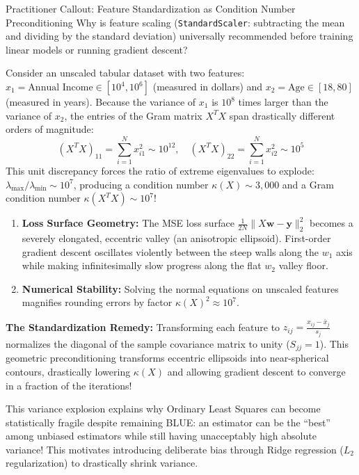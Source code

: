 \begin{intuitionbox}{Practitioner Callout: Feature Standardization as Condition Number Preconditioning}
Why is feature scaling (\texttt{StandardScaler}: subtracting the mean and dividing by the standard deviation) universally recommended before training linear models or running gradient descent?

Consider an unscaled tabular dataset with two features: $x_1 = \text{Annual Income} \in [10^4, 10^6]$ (measured in dollars) and $x_2 = \text{Age} \in [18, 80]$ (measured in years).
Because the variance of $x_1$ is $10^8$ times larger than the variance of $x_2$, the entries of the Gram matrix $X^T X$ span drastically different orders of magnitude:
\begin{equation*}
(X^T X)_{11} = \sum_{i=1}^N x_{i1}^2 \sim 10^{12}, \quad (X^T X)_{22} = \sum_{i=1}^N x_{i2}^2 \sim 10^5
\end{equation*}
This unit discrepancy forces the ratio of extreme eigenvalues to explode: $\lambda_{\max} / \lambda_{\min} \sim 10^7$, producing a condition number $\kappa(X) \sim 3{,}000$ and a Gram condition number $\kappa(X^T X) \sim 10^7$!
\begin{enumerate}
    \item \textbf{Loss Surface Geometry:} The MSE loss surface $\frac{1}{2N}\|X\mathbf{w} - \mathbf{y}\|_2^2$ becomes a severely elongated, eccentric valley (an anisotropic ellipsoid). First-order gradient descent oscillates violently between the steep walls along the $w_1$ axis while making infinitesimally slow progress along the flat $w_2$ valley floor.
    \item \textbf{Numerical Stability:} Solving the normal equations on unscaled features magnifies rounding errors by factor $\kappa(X)^2 \approx 10^7$.
\end{enumerate}
\textbf{The Standardization Remedy:} Transforming each feature to $z_{ij} = \frac{x_{ij} - \bar{x}_j}{s_j}$ normalizes the diagonal of the sample covariance matrix to unity ($S_{jj} = 1$). This geometric preconditioning transforms eccentric ellipsoids into near-spherical contours, drastically lowering $\kappa(X)$ and allowing gradient descent to converge in a fraction of the iterations!
\end{intuitionbox}

This variance explosion explains why Ordinary Least Squares can become statistically fragile despite remaining BLUE: an estimator can be the ``best'' among unbiased estimators while still having unacceptably high absolute variance! This motivates introducing deliberate bias through Ridge regression ($L_2$ regularization) to drastically shrink variance.

